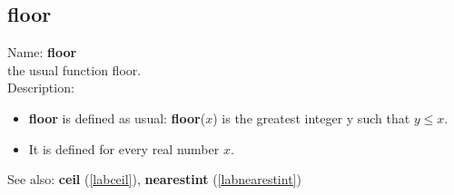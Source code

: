 \subsection{floor}
\label{labfloor}
\noindent Name: \textbf{floor}\\
the usual function floor.\\
\noindent Description: \begin{itemize}

\item \textbf{floor} is defined as usual: \textbf{floor}($x$) is the greatest integer y such that $y \le x$.

\item It is defined for every real number $x$.
\end{itemize}
See also: \textbf{ceil} (\ref{labceil}), \textbf{nearestint} (\ref{labnearestint})
